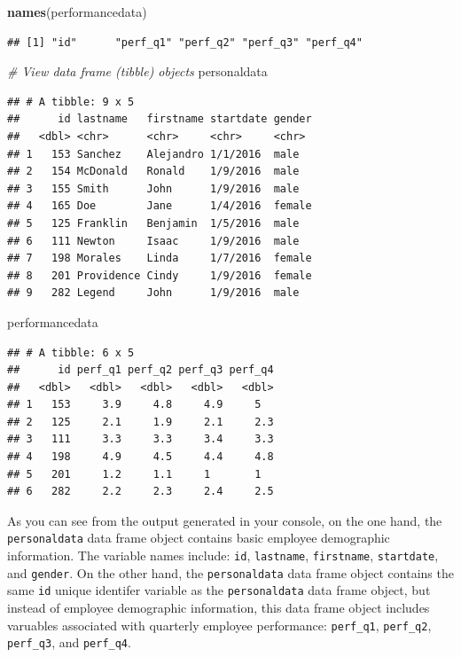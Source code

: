 \documentclass[]{book}
\newenvironment{Shaded}{\begin{snugshade}}{\end{snugshade}}
\newcommand{\KeywordTok}[1]{\textcolor[rgb]{0.13,0.29,0.53}{\textbf{#1}}}
\newcommand{\CommentTok}[1]{\textcolor[rgb]{0.56,0.35,0.01}{\textit{#1}}}
\newcommand{\NormalTok}[1]{#1}
\begin{document}
\begin{Shaded}
\begin{Highlighting}[]
\KeywordTok{names}\NormalTok{(performancedata)}
\end{Highlighting}
\end{Shaded}

\begin{verbatim}
## [1] "id"      "perf_q1" "perf_q2" "perf_q3" "perf_q4"
\end{verbatim}

\begin{Shaded}
\begin{Highlighting}[]
\CommentTok{# View data frame (tibble) objects}
\NormalTok{personaldata}
\end{Highlighting}
\end{Shaded}

\begin{verbatim}
## # A tibble: 9 x 5
##      id lastname   firstname startdate gender
##   <dbl> <chr>      <chr>     <chr>     <chr> 
## 1   153 Sanchez    Alejandro 1/1/2016  male  
## 2   154 McDonald   Ronald    1/9/2016  male  
## 3   155 Smith      John      1/9/2016  male  
## 4   165 Doe        Jane      1/4/2016  female
## 5   125 Franklin   Benjamin  1/5/2016  male  
## 6   111 Newton     Isaac     1/9/2016  male  
## 7   198 Morales    Linda     1/7/2016  female
## 8   201 Providence Cindy     1/9/2016  female
## 9   282 Legend     John      1/9/2016  male
\end{verbatim}

\begin{Shaded}
\begin{Highlighting}[]
\NormalTok{performancedata}
\end{Highlighting}
\end{Shaded}

\begin{verbatim}
## # A tibble: 6 x 5
##      id perf_q1 perf_q2 perf_q3 perf_q4
##   <dbl>   <dbl>   <dbl>   <dbl>   <dbl>
## 1   153     3.9     4.8     4.9     5  
## 2   125     2.1     1.9     2.1     2.3
## 3   111     3.3     3.3     3.4     3.3
## 4   198     4.9     4.5     4.4     4.8
## 5   201     1.2     1.1     1       1  
## 6   282     2.2     2.3     2.4     2.5
\end{verbatim}

As you can see from the output generated in your console, on the one
hand, the \texttt{personaldata} data frame object contains basic
employee demographic information. The variable names include:
\texttt{id}, \texttt{lastname}, \texttt{firstname}, \texttt{startdate},
and \texttt{gender}. On the other hand, the \texttt{personaldata} data
frame object contains the same \texttt{id} unique identifer variable as
the \texttt{personaldata} data frame object, but instead of employee
demographic information, this data frame object includes varuables
associated with quarterly employee performance: \texttt{perf\_q1},
\texttt{perf\_q2}, \texttt{perf\_q3}, and \texttt{perf\_q4}.
\end{document}

